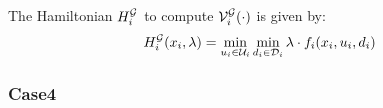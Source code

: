 The Hamiltonian $H^{\mathcal{G}}_{i}$ to compute $\mathcal{V}^{\mathcal{G}}_{i}(\cdot)$ is given by:
\begin{equation} \label{eqn:BRS_obsham}
\ham^{\mathcal{G}}_{i}(\state_i, \costate) = \min_{\ctrl_i \in \cset_i} \min_{\dstb_i \in \dset_i} \costate \cdot f_i (\state_i, \ctrl_i, \dstb_i)
\end{equation}

\subsubsection{Case4} \label{sec:intruderObs_case4}



